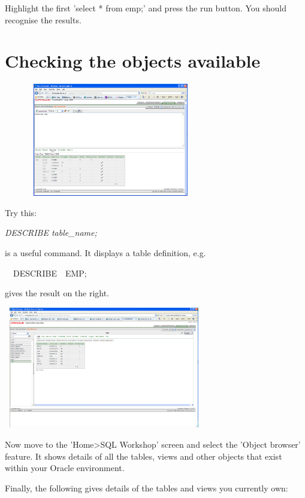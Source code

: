 Highlight the first 'select * from emp;' and press the run button.  You should recognise the results.

\section{Checking the objects available}


\begin{center}
  
\includegraphics[width=9.35cm,height=4.944cm]{images/img (12).png}

\end{center}
Try this:

\emph{DESCRIBE table\_name;}

is a useful command. It displays a table definition, e.g.

\ \ DESCRIBE\ \ EMP;

gives the result on the right.



\begin{center}
  
\includegraphics[width=8.751cm,height=5.309cm]{images/img (13).png}

\end{center}
Now move to the 'Home{\textgreater}SQL Workshop' screen and select the 'Object browser' feature. It shows details of all the tables, views and other objects that exist within your Oracle environment. 

Finally, the following gives details of the tables and views you currently own:

